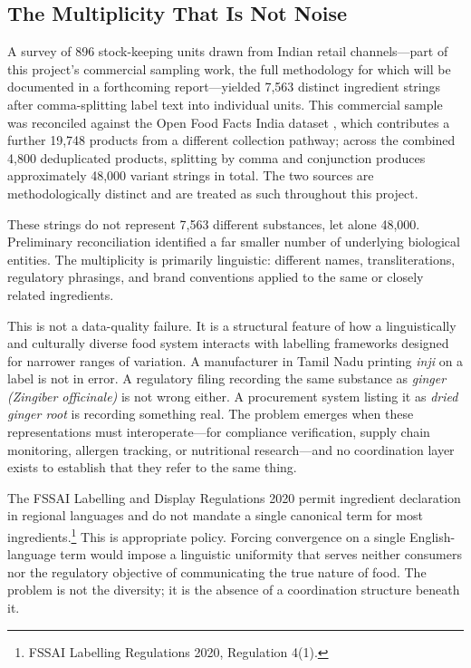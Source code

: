 \documentclass[12pt,a3paper]{article}
\begin{document}
\subsection{The Multiplicity That Is Not Noise}

A survey of 896 stock-keeping units drawn from Indian retail channels---part of this project's commercial sampling work, the full methodology for which will be documented in a forthcoming report---yielded 7,563 distinct ingredient strings after comma-splitting label text into individual units. This commercial sample was reconciled against the Open Food Facts India dataset \cite{OpenFoodFacts}, which contributes a further 19,748 products from a different collection pathway; across the combined 4,800 deduplicated products, splitting by comma and conjunction produces approximately 48,000 variant strings in total. The two sources are methodologically distinct and are treated as such throughout this project.

These strings do not represent 7,563 different substances, let alone 48,000. Preliminary reconciliation identified a far smaller number of underlying biological entities. The multiplicity is primarily linguistic: different names, transliterations, regulatory phrasings, and brand conventions applied to the same or closely related ingredients.

This is not a data-quality failure. It is a structural feature of how a linguistically and culturally diverse food system interacts with labelling frameworks designed for narrower ranges of variation. A manufacturer in Tamil Nadu printing \textit{inji} on a label is not in error. A regulatory filing recording the same substance as \textit{ginger (Zingiber officinale)} is not wrong either. A procurement system listing it as \textit{dried ginger root} is recording something real. The problem emerges when these representations must interoperate---for compliance verification, supply chain monitoring, allergen tracking, or nutritional research---and no coordination layer exists to establish that they refer to the same thing.

The FSSAI Labelling and Display Regulations 2020 permit ingredient declaration in regional languages and do not mandate a single canonical term for most ingredients.\footnote{FSSAI Labelling Regulations 2020, Regulation 4(1).} This is appropriate policy. Forcing convergence on a single English-language term would impose a linguistic uniformity that serves neither consumers nor the regulatory objective of communicating the true nature of food. The problem is not the diversity; it is the absence of a coordination structure beneath it.
\end{document}

